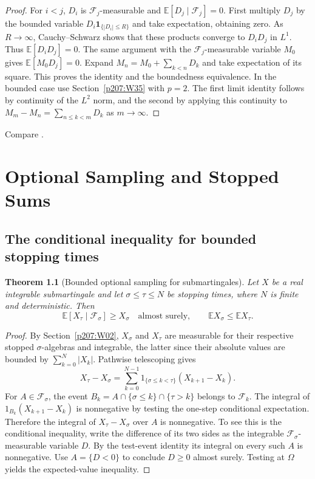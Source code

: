\documentclass[11pt,oneside,openany]{book}
\theoremstyle{plain}
\newtheorem{theorem}{Theorem}[chapter]
\theoremstyle{definition}
\theoremstyle{remark}
\begin{document}
\begin{proof}
For \(i<j\), \(D_i\) is \(\mathcal F_j\)-measurable and
\(\mathbb E[D_j\mid\mathcal F_j]=0\).
First multiply \(D_j\) by the bounded variable
\(D_i\mathbf 1_{\{|D_i|\le R\}}\) and take expectation, obtaining zero.
As \(R\to\infty\), Cauchy--Schwarz shows that these products converge
to \(D_i D_j\) in \(L^1\). Thus \(\mathbb E[D_iD_j]=0\).
The same argument with the \(\mathcal F_j\)-measurable variable
\(M_0\) gives \(\mathbb E[M_0D_j]=0\).
Expand \(M_n=M_0+\sum_{k<n}D_k\) and take expectation of its
square. This proves the identity and the boundedness equivalence.
In the bounded case use Section~\ref{p207:W35} with \(p=2\).
The first limit identity follows by continuity of the \(L^2\) norm,
and the second by applying this continuity to
\(M_m-M_n=\sum_{n\le k<m}D_k\) as \(m\to\infty\).
\end{proof}

\noindent
Compare \cite[Section 12.1]{Williams}.
\chapter{Optional Sampling and Stopped Sums}

\section{The conditional inequality for bounded stopping times}\label{p207:W39}

\begin{theorem}[Bounded optional sampling for submartingales]
Let \(X\) be a real integrable submartingale and let
\(\sigma\le\tau\le N\) be stopping times, where \(N\) is finite
and deterministic. Then
\[
  \mathbb E[X_\tau\mid\mathcal F_\sigma]\ge X_\sigma
       \quad\text{almost surely},
  \qquad
  \mathbb E X_\sigma\le \mathbb E X_\tau .
\]
\end{theorem}
\begin{proof}
By Section~\ref{p207:W02}, \(X_\sigma\) and \(X_\tau\) are
measurable for their respective stopped \(\sigma\)-algebras and
integrable, the latter since their absolute values are bounded
by \(\sum_{k=0}^N|X_k|\).
Pathwise telescoping gives
\[
 X_\tau-X_\sigma
     =\sum_{k=0}^{N-1}1_{\{\sigma\le k<\tau\}}(X_{k+1}-X_k).
\]
For \(A\in\mathcal F_\sigma\), the event
\(B_k=A\cap\{\sigma\le k\}\cap\{\tau>k\}\) belongs to
\(\mathcal F_k\). The integral of \(1_{B_k}(X_{k+1}-X_k)\)
is nonnegative by testing the one-step conditional expectation.
Therefore the integral of \(X_\tau-X_\sigma\) over \(A\)
is nonnegative. To see this is the conditional inequality,
write the difference of its two sides as the integrable
\(\mathcal F_\sigma\)-measurable variable \(D\). By the test-event
identity its integral on every such \(A\) is nonnegative.
Use \(A=\{D<0\}\) to conclude \(D\ge0\) almost surely.
Testing at \(\Omega\) yields the expected-value inequality.
\end{proof}
\end{document}
